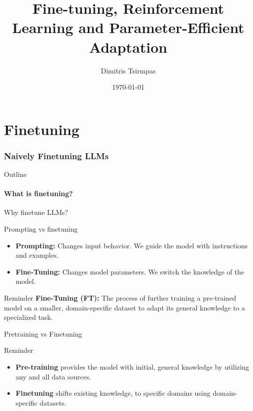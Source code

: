 \documentclass[24pt]{beamer}
\title[LLM Learning]{Fine-tuning, Reinforcement Learning and Parameter-Efficient Adaptation}
\author{Dimitris Tsirmpas} \date{\today}
\institute{Athens University of Economics and Business \and Archimedes, Athena Research Center}
\newcommand{\partslide}{
	\begin{frame}
		\partpage
	\end{frame}
}
\newcommand{\sectionslide}{
	\begin{frame}{Outline}
		\tableofcontents[currentsection]
	\end{frame}
}
\newcommand{\subsectionslide}{
	\begin{frame}
		\sectionpage
		\subsectionpage
	\end{frame}
}
\begin{document}
	
\begin{frame}
	\titlepage
\end{frame}

\part{Finetuning}
\partslide


\section{Naively Finetuning LLMs}
\sectionslide

\subsection{What is finetuning?}
\subsectionslide

\begin{frame}{Why finetune LLMs?}
   \begin{block}{Prompting vs finetuning}
	   \begin{itemize}
			\item \textbf{Prompting:} Changes \alert{input behavior}. We guide
			the model with instructions and examples. \item
			\textbf{Fine-Tuning:} Changes \alert{model parameters}. We switch
			the \alert{knowledge} of the model.
	   \end{itemize}
   \end{block}
    \begin{block}{Reminder}
        \textbf{Fine-Tuning (FT):} The process of further training a
        pre-trained model on a smaller, domain-specific dataset to adapt its
        general knowledge to a specialized task.
    \end{block}
\end{frame}

\begin{frame}{Pretraining vs Finetuning}
   	\begin{block}{Reminder}
   		\begin{itemize}
   			\item \textbf{Pre-training} provides the model with initial, \alert{general} knowledge by utilizing \alert{any} and all data sources. 
   			\item \textbf{Finetuning} shifts existing knowledge, to \alert{specific} domains using \alert{domain-specific} datasets.
   		\end{itemize}
   	\end{block}
\end{frame}
\end{document}
